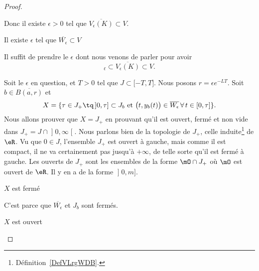 \begin{proof}
\begin{subproof}
        Donc il existe \( \epsilon>0\) tel que \( \overline{ V_{\epsilon}(K) }\subset V\).

    \item[Il existe \( \epsilon\) tel que \( \overline{ W_{\epsilon} }\subset V\)]

        Il suffit de prendre le \( \epsilon\) dont nous venons de parler pour avoir
        \begin{equation}
            \overline{ _{\epsilon} }\subset \overline{ V_{\epsilon}(K) }\subset V.
        \end{equation}

    \end{subproof}
    Soit le \( \epsilon\) en question, et \( T>0\) tel que \( J\subset \mathopen[ -T , T \mathclose]\). Nous posons \( r=\epsilon e^{-LT}\). Soit \( b\in \overline{ B(a,r) } \) et
    \begin{equation}
    X=\{ \tau\in J_{+}\tq\,\mathopen] 0 , \tau \mathclose]\subset J_b\text{ et }    \big( t,y_b(t) \big)\in \overline{ W_{\epsilon} }\,\forall\,t\in\mathopen[ 0 , \tau \mathclose]     \}.
    \end{equation}
Nous allons prouver que \( X=J_{+}\) en prouvant qu'il est ouvert, fermé et non vide dans \( J_+=J\cap\mathopen] 0 , \infty \mathclose[\). Nous parlons bien de la topologie de \( J_+\), celle induite\footnote{Définition~\ref{DefVLrgWDB}.} de \( \eR\). Vu que \( 0\in J\), l'ensemble \( J_+\) est ouvert à gauche, mais comme il est compact, il ne va certainement pas jusqu'à \( +\infty\), de telle sorte qu'il est fermé à gauche. Les ouverts de \( J_+\) sont les ensembles de la forme \( \mO\cap J_+\) où \( \mO\) est ouvert de \( \eR\). Il y en a de la forme \( \mathopen] 0 , m \mathclose]\).

    \begin{subproof}
        \item[\( X\) est fermé]

            C'est parce que \( \overline{ W_{\epsilon} }\) et \( J_b\) sont fermés.

        \item[\( X\) est ouvert]


\end{subproof}
\end{proof}
